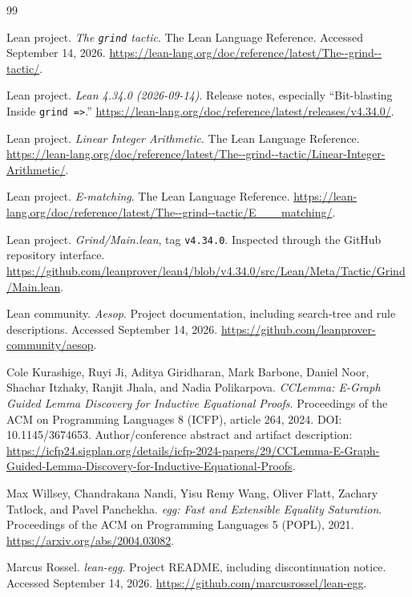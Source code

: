 \begin{thebibliography}{99}
\small

Lean project. \emph{The \texttt{grind} tactic}. The Lean Language Reference.
Accessed September 14, 2026.
\url{https://lean-lang.org/doc/reference/latest/The--grind--tactic/}.

Lean project. \emph{Lean 4.34.0 (2026-09-14)}. Release notes, especially
``Bit-blasting Inside \texttt{grind =>}.''
\url{https://lean-lang.org/doc/reference/latest/releases/v4.34.0/}.

Lean project. \emph{Linear Integer Arithmetic}. The Lean Language Reference.
\url{https://lean-lang.org/doc/reference/latest/The--grind--tactic/Linear-Integer-Arithmetic/}.

Lean project. \emph{E-matching}. The Lean Language Reference.
\url{https://lean-lang.org/doc/reference/latest/The--grind--tactic/E___matching/}.

Lean project. \emph{Grind/Main.lean}, tag \texttt{v4.34.0}.
Inspected through the GitHub repository interface.
\url{https://github.com/leanprover/lean4/blob/v4.34.0/src/Lean/Meta/Tactic/Grind/Main.lean}.

Lean community. \emph{Aesop}. Project documentation, including search-tree and
rule descriptions. Accessed September 14, 2026.
\url{https://github.com/leanprover-community/aesop}.

Cole Kurashige, Ruyi Ji, Aditya Giridharan, Mark Barbone, Daniel Noor,
Shachar Itzhaky, Ranjit Jhala, and Nadia Polikarpova.
\emph{CCLemma: E-Graph Guided Lemma Discovery for Inductive Equational Proofs}.
Proceedings of the ACM on Programming Languages 8 (ICFP), article 264, 2024.
DOI: 10.1145/3674653. Author/conference abstract and artifact description:
\url{https://icfp24.sigplan.org/details/icfp-2024-papers/29/CCLemma-E-Graph-Guided-Lemma-Discovery-for-Inductive-Equational-Proofs}.

Max Willsey, Chandrakana Nandi, Yisu Remy Wang, Oliver Flatt,
Zachary Tatlock, and Pavel Panchekha.
\emph{egg: Fast and Extensible Equality Saturation}.
Proceedings of the ACM on Programming Languages 5 (POPL), 2021.
\url{https://arxiv.org/abs/2004.03082}.

Marcus Rossel. \emph{lean-egg}. Project README, including discontinuation notice.
Accessed September 14, 2026.
\url{https://github.com/marcusrossel/lean-egg}.


\end{thebibliography}
